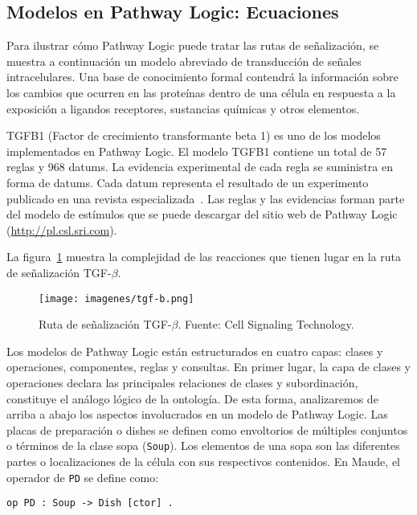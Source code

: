 \subsection{Modelos en Pathway Logic: Ecuaciones}
Para ilustrar cómo Pathway Logic puede tratar las rutas de señalización, se muestra a continuación un modelo abreviado de transducción de señales intracelulares.
Una base de conocimiento formal contendrá la información sobre los cambios que ocurren en las proteínas dentro de una célula en respuesta a la exposición a ligandos receptores, sustancias químicas y otros elementos.

TGFB1 (Factor de crecimiento transformante beta 1) es uno de los modelos implementados en Pathway Logic. El modelo TGFB1 contiene un total de 57 reglas y 968 datums. La evidencia experimental de cada regla se suministra en forma de datums. Cada datum representa el resultado de un experimento publicado en una revista especializada~\citep{sfm/Talcott08}. Las reglas y las evidencias forman parte del modelo de estímulos que se puede descargar del sitio web de Pathway Logic (\url{http://pl.csl.sri.com}). 

La figura~\ref{fig:tgf-b} muestra la complejidad de las reacciones que tienen lugar en la ruta de señalización TGF-$\beta$.

\begin{figure}[h!]
\centering
\texttt{[image: imagenes/tgf-b.png]}
\caption[Ruta de señalización TGF-$\beta$]{Ruta de señalización TGF-$\beta$. Fuente: Cell Signaling Technology.}
\label{fig:tgf-b}
\end{figure}

Los modelos de Pathway Logic están estructurados en cuatro capas: clases y operaciones, componentes, reglas y consultas. En primer lugar, la capa de clases y operaciones declara las principales relaciones de clases y subordinación, constituye el análogo lógico de la ontología. De esta forma, analizaremos de arriba a abajo los aspectos involucrados en un modelo de Pathway Logic. Las placas de preparación o dishes se definen como envoltorios de múltiples conjuntos o términos de la clase sopa (\texttt{Soup}). Los elementos de una sopa son las diferentes partes o localizaciones de la célula con sus respectivos contenidos. En Maude, el operador de \texttt{PD} se define como:

\begin{lstlisting}[language=Maude]
  op PD : Soup -> Dish [ctor] .
\end{lstlisting}

